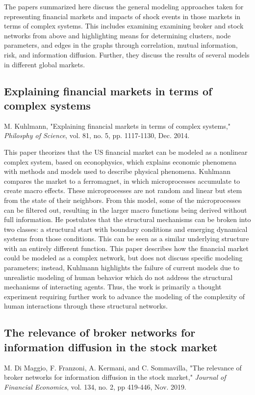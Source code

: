 \documentclass[12pt]{article}
\begin{document}
The papers summarized here discuss the general modeling approaches taken for representing financial markets and impacts of shock events in those markets in terms of complex systems. This includes examining examining broker and stock networks from above and highlighting means for determining clusters, node parameters, and edges in the graphs through correlation, mutual information, risk, and information diffusion. Further, they discuss the results of several models in different global markets.


\subsection{Explaining financial markets in terms of complex systems}
M. Kuhlmann, "Explaining financial markets in terms of complex systems," \textit{Philosphy of Science}, vol. 81, no. 5, pp. 1117-1130, Dec. 2014. %
\newline

This paper theorizes that the US financial market can be modeled as a nonlinear complex system, based on econophysics, which explains economic phenomena with methods and models used to describe physical phenomena. Kuhlmann compares the market to a ferromagnet, in which microprocesses accumulate to create macro effects. These microprocesses are not random and linear but stem from the state of their neighbors. From this model, some of the microprocesses can be filtered out, resulting in the larger macro functions being derived without full information. He postulates that the structural mechanisms can be broken into two classes: a structural start with boundary conditions and emerging dynamical systems from those conditions. This can be seen as a similar underlying structure with an entirely different function. This paper describes how the financial market could be modeled as a complex network, but does not discuss specific modeling parameters; instead, Kuhlmann highlights the failure of current models due to unrealistic modeling of human behavior which do not address the structural mechanisms of interacting agents. Thus, the work is primarily a thought experiment requiring further work to advance the modeling of the complexity of human interactions through these structural networks.


\subsection{The relevance of broker networks for information diffusion in the stock market}
M. Di Maggio, F. Franzoni, A. Kermani, and C. Sommavilla, "The relevance of broker networks for information diffusion in the stock market," \textit{Journal of Financial Economics}, vol. 134, no. 2, pp 419-446, Nov. 2019. %
\newline
\end{document}
